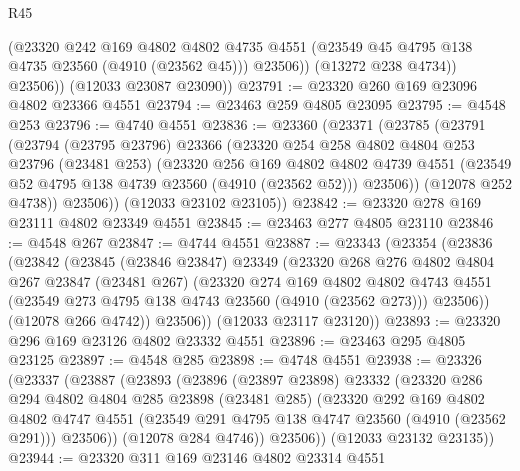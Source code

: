 \begin{lexlean}{R45}
\begin{coremodule}
              (@23320
                @242
                @169
                @4802
                @4802
                @4735
                @4551
                (@23549 @45 @4795 @138 @4735 @23560 (@4910 (@23562 @45)))
                @23506))
            (@13272 @238 @4734))
          @23506))
      (@12033 @23087 @23090))
@23791 := @23320 @260 @169 @23096 @4802 @23366 @4551
@23794 := @23463 @259 @4805 @23095
@23795 := @4548 @253
@23796 := @4740 @4551
@23836 := @23360
    (@23371
      (@23785
        (@23791
          (@23794
            (@23795 @23796)
            @23366
            (@23320
              @254
              @258
              @4802
              @4804
              @253
              @23796
              (@23481 @253)
              (@23320
                @256
                @169
                @4802
                @4802
                @4739
                @4551
                (@23549 @52 @4795 @138 @4739 @23560 (@4910 (@23562 @52)))
                @23506))
            (@12078 @252 @4738))
          @23506))
      (@12033 @23102 @23105))
@23842 := @23320 @278 @169 @23111 @4802 @23349 @4551
@23845 := @23463 @277 @4805 @23110
@23846 := @4548 @267
@23847 := @4744 @4551
@23887 := @23343
    (@23354
      (@23836
        (@23842
          (@23845
            (@23846 @23847)
            @23349
            (@23320
              @268
              @276
              @4802
              @4804
              @267
              @23847
              (@23481 @267)
              (@23320
                @274
                @169
                @4802
                @4802
                @4743
                @4551
                (@23549 @273 @4795 @138 @4743 @23560 (@4910 (@23562 @273)))
                @23506))
            (@12078 @266 @4742))
          @23506))
      (@12033 @23117 @23120))
@23893 := @23320 @296 @169 @23126 @4802 @23332 @4551
@23896 := @23463 @295 @4805 @23125
@23897 := @4548 @285
@23898 := @4748 @4551
@23938 := @23326
    (@23337
      (@23887
        (@23893
          (@23896
            (@23897 @23898)
            @23332
            (@23320
              @286
              @294
              @4802
              @4804
              @285
              @23898
              (@23481 @285)
              (@23320
                @292
                @169
                @4802
                @4802
                @4747
                @4551
                (@23549 @291 @4795 @138 @4747 @23560 (@4910 (@23562 @291)))
                @23506))
            (@12078 @284 @4746))
          @23506))
      (@12033 @23132 @23135))
@23944 := @23320 @311 @169 @23146 @4802 @23314 @4551

\end{coremodule}
\end{lexlean}

